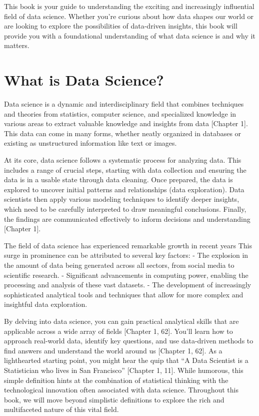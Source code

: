 \documentclass[
  letterpaper,
  DIV=11,
  numbers=noendperiod]{scrreprt}
\begin{document}
This book is your guide to understanding the exciting and increasingly
influential field of data science. Whether you're curious about how data
shapes our world or are looking to explore the possibilities of
data-driven insights, this book will provide you with a foundational
understanding of what data science is and why it matters.

\section{What is Data Science?}\label{what-is-data-science}

Data science is a dynamic and interdisciplinary field that combines
techniques and theories from statistics, computer science, and
specialized knowledge in various areas to extract valuable knowledge and
insights from data {[}Chapter 1{]}. This data can come in many forms,
whether neatly organized in databases or existing as unstructured
information like text or images.

At its core, data science follows a systematic process for analyzing
data. This includes a range of crucial steps, starting with data
collection and ensuring the data is in a usable state through data
cleaning. Once prepared, the data is explored to uncover initial
patterns and relationships (data exploration). Data scientists then
apply various modeling techniques to identify deeper insights, which
need to be carefully interpreted to draw meaningful conclusions.
Finally, the findings are communicated effectively to inform decisions
and understanding {[}Chapter 1{]}.

The field of data science has experienced remarkable growth in recent
years This surge in prominence can be attributed to several key factors:
- The explosion in the amount of data being generated across all
sectors, from social media to scientific research. - Significant
advancements in computing power, enabling the processing and analysis of
these vast datasets. - The development of increasingly sophisticated
analytical tools and techniques that allow for more complex and
insightful data exploration.

By delving into data science, you can gain practical analytical skills
that are applicable across a wide array of fields {[}Chapter 1, 62{]}.
You'll learn how to approach real-world data, identify key questions,
and use data-driven methods to find answers and understand the world
around us {[}Chapter 1, 62{]}. As a lighthearted starting point, you
might hear the quip that ``A Data Scientist is a Statistician who lives
in San Francisco'' {[}Chapter 1, 11{]}. While humorous, this simple
definition hints at the combination of statistical thinking with the
technological innovation often associated with data science. Throughout
this book, we will move beyond simplistic definitions to explore the
rich and multifaceted nature of this vital field.
\end{document}
